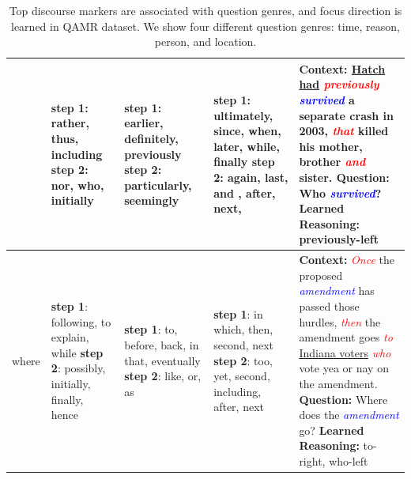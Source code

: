 \begin{table}[t]
{\begin{tabular}{|p{1.8cm}|p{2.5cm}|p{2.5cm}|p{2.5cm}|p{5.8cm}|}
	& \textbf{step 1}: rather, thus, including \newline\newline\textbf{step 2}: nor, who, initially &\textbf{step 1}: earlier, definitely, previously \newline\newline\textbf{step 2}: particularly, seemingly
		&\textbf{step 1}: ultimately, since, when, later, while, finally \newline \textbf{step 2}: again, last, and , after, next, 
	& \textbf{Context: }\underline{Hatch had} \textit{\textcolor{red}{previously}} \textit{\textcolor{blue}{survived}} a separate crash in 2003, \textit{\textcolor{red}{that}} killed his mother, brother \textit{\textcolor{red}{and}} sister.
  \newline \textbf{Question: }Who \textit{\textcolor{blue}{survived}}?\newline \textbf{Learned Reasoning: }previously-left\\ 
	\hline
  where 
 
  
	 &\textbf{step 1}: following, to explain, while \newline\newline\textbf{step 2}: possibly, initially, finally, hence &\textbf{step 1}: to, before, back, in that, eventually \newline\textbf{step 2}: like, or, as & \textbf{step 1}: in which, then, second, next \newline\newline \textbf{step 2}: too, yet, second, including, after, next
  & \textbf{Context: }\textit{\textcolor{red}{Once}} the proposed \textit{\textcolor{blue}{amendment}} has passed those hurdles, \textit{\textcolor{red}{then}} the amendment goes \textit{\textcolor{red}{to}} \underline{Indiana voters} \textit{\textcolor{red}{who}} vote yea or nay on the amendment. 
  \newline \textbf{Question: }Where does the \textit{\textcolor{blue}{amendment}} go?
  \newline \textbf{Learned Reasoning: }to-right, who-left\\ 
 \hline
\end{tabular}
}
\caption{\fontsize{9}{12}\selectfont Top discourse markers are associated with question genres, and focus direction is learned in \textsc{QAMR} dataset. We show four different question genres: time, reason, person, and location.}
\label{tab:disc_phrase}
\vspace{-3ex}
\end{table}


